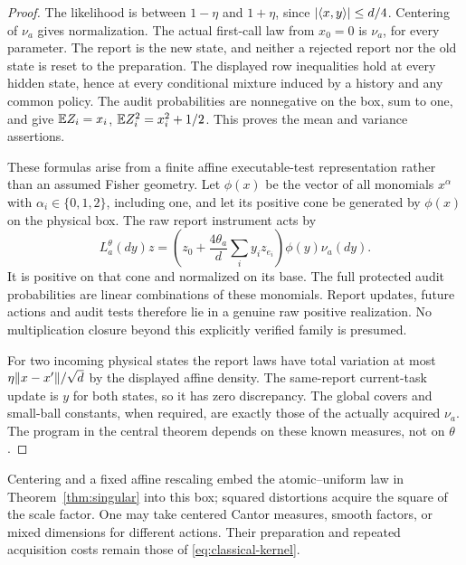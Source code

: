 \begin{proof}
The likelihood is between $1-\eta$ and $1+\eta$, since $|\langle x,y\rangle|\le d/4$. Centering of $\nu_a$ gives normalization. The actual first-call law from $x_0=0$ is $\nu_a$, for every parameter. The report is the new state, and neither a rejected report nor the old state is reset to the preparation. The displayed row inequalities hold at every hidden state, hence at every conditional mixture induced by a history and any common policy. The audit probabilities are nonnegative on the box, sum to one, and give $\mathbb E Z_i=x_i$, $\mathbb E Z_i^2=x_i^2+1/2$. This proves the mean and variance assertions.

These formulas arise from a finite affine executable-test representation rather than an assumed Fisher geometry. Let $\phi(x)$ be the vector of all monomials $x^\alpha$ with $\alpha_i\in\{0,1,2\}$, including one, and let its positive cone be generated by $\phi(x)$ on the physical box. The raw report instrument acts by
\[
 L_a^\theta(dy)z
 =\left(z_0+\frac{4\theta_a}{d}\sum_i y_i z_{e_i}\right)\phi(y)\nu_a(dy).
\]
It is positive on that cone and normalized on its base. The full protected audit probabilities are linear combinations of these monomials. Report updates, future actions and audit tests therefore lie in a genuine raw positive realization. No multiplication closure beyond this explicitly verified family is presumed.

For two incoming physical states the report laws have total variation at most $\eta\lVert x-x'\rVert/\sqrt d$ by the displayed affine density. The same-report current-task update is $y$ for both states, so it has zero discrepancy. The global covers and small-ball constants, when required, are exactly those of the actually acquired $\nu_a$. The program in the central theorem depends on these known measures, not on $\theta$.
\end{proof}

Centering and a fixed affine rescaling embed the atomic--uniform law in Theorem~\ref{thm:singular} into this box; squared distortions acquire the square of the scale factor. One may take centered Cantor measures, smooth factors, or mixed dimensions for different actions. Their preparation and repeated acquisition costs remain those of \eqref{eq:classical-kernel}.

